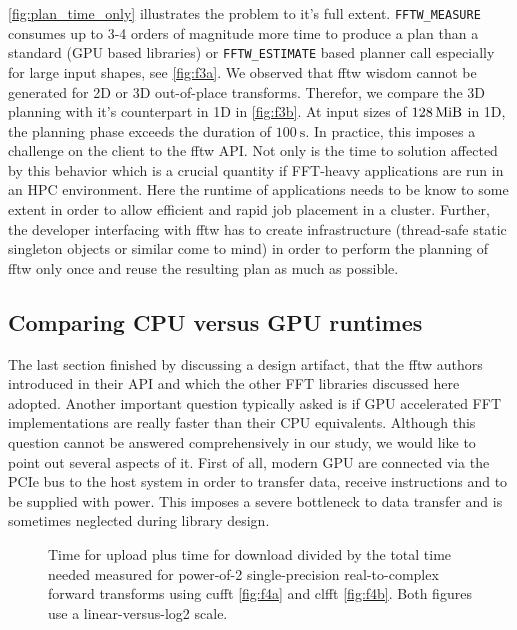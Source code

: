 \cref{fig:plan_time_only} illustrates the problem to it's full extent. \texttt{FFTW\_MEASURE} consumes up to 3-4 orders of magnitude more time to produce a plan than a standard (GPU based libraries) or \texttt{FFTW\_ESTIMATE} based planner call especially for large input shapes, see \cref{fig:f3a}. We observed that fftw wisdom cannot be generated for 2D or 3D out-of-place transforms. Therefor, we compare the 3D planning with it's counterpart in 1D in \cref{fig:f3b}. At input sizes of $\SI{128}{\mebi\byte}$ in 1D, the planning phase exceeds the duration of $\SI{100}{\s}$. In practice, this imposes a challenge on the client to the fftw API. Not only is the time to solution affected by this behavior which is a crucial quantity if FFT-heavy applications are run in an HPC environment. Here the runtime of applications needs to be know to some extent in order to allow efficient and rapid job placement in a cluster. Further, the developer interfacing with fftw has to create infrastructure (thread-safe static singleton objects or similar come to mind) in order to perform the planning of fftw only once and reuse the resulting plan as much as possible.

\subsection{Comparing CPU versus GPU runtimes}
\label{ssec:cpu_vs_gpu}

The last section finished by discussing a design artifact, that the fftw authors introduced in their API and which the other FFT libraries discussed here adopted. Another important question typically asked is if GPU accelerated FFT implementations are really faster than their CPU equivalents. Although this question cannot be answered comprehensively in our study, we would like to point out several aspects of it. First of all, modern GPU are connected via the PCIe bus to the host system in order to transfer data, receive instructions and to be supplied with power. This imposes a severe bottleneck to data transfer and is sometimes neglected during library design. 

\begin{figure}[!tbp]
  \centering
  \def\svgwidth{0.95\columnwidth}
  
  \def\svgwidth{0.45\columnwidth}
  \subfloat[cufft 8.0.44]{\label{fig:f4a}}
  \hfill
  \def\svgwidth{0.45\columnwidth}
  \subfloat[clfft 2.12.2]{\label{fig:f4b}}
  \caption{Time for upload plus time for download divided by the total time needed measured for power-of-2 single-precision real-to-complex forward transforms using cufft \cref{fig:f4a} and clfft \cref{fig:f4b}. Both figures use a linear-versus-log2 scale.}
  \label{fig:device_transfer}
\end{figure}

